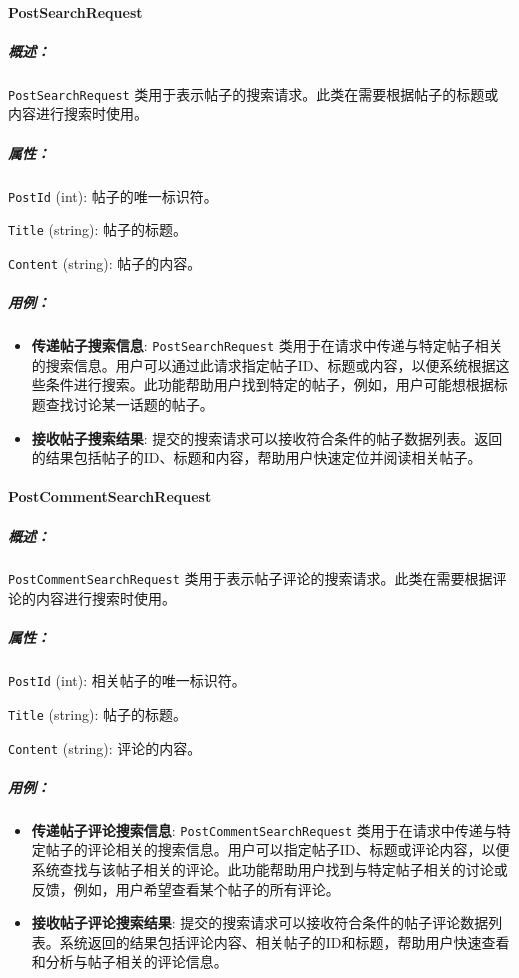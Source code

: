 \paragraph{PostSearchRequest}
\subparagraph{概述：} \texttt{PostSearchRequest} 类用于表示帖子的搜索请求。此类在需要根据帖子的标题或内容进行搜索时使用。

\subparagraph{属性：}

\texttt{PostId} (int): 帖子的唯一标识符。

\texttt{Title} (string): 帖子的标题。

\texttt{Content} (string): 帖子的内容。


\subparagraph{用例：}
\begin{itemize}
	\item \textbf{传递帖子搜索信息}: \texttt{PostSearchRequest} 类用于在请求中传递与特定帖子相关的搜索信息。用户可以通过此请求指定帖子ID、标题或内容，以便系统根据这些条件进行搜索。此功能帮助用户找到特定的帖子，例如，用户可能想根据标题查找讨论某一话题的帖子。
	\item \textbf{接收帖子搜索结果}: 提交的搜索请求可以接收符合条件的帖子数据列表。返回的结果包括帖子的ID、标题和内容，帮助用户快速定位并阅读相关帖子。
\end{itemize}

\paragraph{PostCommentSearchRequest}
\subparagraph{概述：} \texttt{PostCommentSearchRequest} 类用于表示帖子评论的搜索请求。此类在需要根据评论的内容进行搜索时使用。

\subparagraph{属性：}

\texttt{PostId} (int): 相关帖子的唯一标识符。

\texttt{Title} (string): 帖子的标题。

\texttt{Content} (string): 评论的内容。


\subparagraph{用例：}
\begin{itemize}
	\item \textbf{传递帖子评论搜索信息}: \texttt{PostCommentSearchRequest} 类用于在请求中传递与特定帖子的评论相关的搜索信息。用户可以指定帖子ID、标题或评论内容，以便系统查找与该帖子相关的评论。此功能帮助用户找到与特定帖子相关的讨论或反馈，例如，用户希望查看某个帖子的所有评论。
	\item \textbf{接收帖子评论搜索结果}: 提交的搜索请求可以接收符合条件的帖子评论数据列表。系统返回的结果包括评论内容、相关帖子的ID和标题，帮助用户快速查看和分析与帖子相关的评论信息。
\end{itemize}

